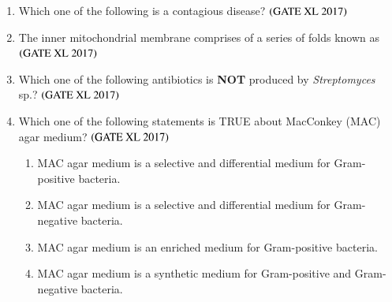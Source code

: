 \documentclass[journal]{IEEEtran}
\begin{document}
\begin{enumerate}
\item Which one of the following is a contagious disease?  \hfill $\left(\text{GATE XL 2017}\right)$

\begin{enumerate}
\end{enumerate}

\item The inner mitochondrial membrane comprises of a series of folds known as  \hfill $\left(\text{GATE XL 2017}\right)$

\begin{enumerate}
\end{enumerate}

\item Which one of the following antibiotics is \textbf{NOT} produced by \textit{Streptomyces} sp.? \hfill $\left(\text{GATE XL 2017}\right)$ 

\begin{enumerate}
\end{enumerate}

\item Which one of the following statements is TRUE about MacConkey (MAC) agar medium?  \hfill $\left(\text{GATE XL 2017}\right)$

\begin{enumerate}
\item MAC agar medium is a selective and differential medium for Gram-positive bacteria.
\item MAC agar medium is a selective and differential medium for Gram-negative bacteria.
\item MAC agar medium is an enriched medium for Gram-positive bacteria.
\item MAC agar medium is a synthetic medium for Gram-positive and Gram-negative bacteria.
\end{enumerate}


\end{enumerate}
\end{document}
